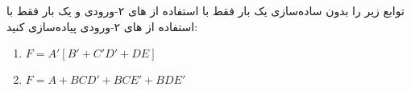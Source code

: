 توابع زیر را بدون ساده‌سازی یک بار فقط با استفاده از های ۲-ورودی و یک بار فقط با استفاده از های ۲-ورودی پیاده‌سازی کنید:

\begin{latin}
	\begin{enumerate}
		\item 
		$ F = A' [B' + C' D' + DE] $
		
		\item 
		$ F = A + BCD' + BCE' + BDE' $
	\end{enumerate}
\end{latin}